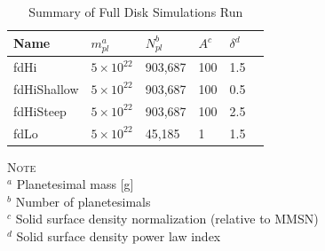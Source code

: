 \documentclass[twocolumn]{aastex63}
\begin{document}



\begin{table}
\caption{Summary of Full Disk Simulations Run}
\begin{tabular}{llllll} \hline \hline
Name    & $m_{pl}^{a}$ & $N_{pl}^{b}$ & $A^{c}$ & $\delta^{d}$ &  \\ \hline
fdHi                 & $5 \times 10^{22}$ & 903,687 & 100                                                         & 1.5                              &   \\
fdHiShallow    & $5 \times 10^{22}$ & 903,687 & 100                                                        & 0.5                              &   \\
fdHiSteep       & $5 \times 10^{22}$ & 903,687 & 100                                                         & 2.5                              &   \\
fdLo                & $5 \times 10^{22}$ & 45,185    & 1                                                             & 1.5                              &   \\ \hline
\end{tabular}
\begin{flushleft}
\textsc{Note} \\ {$^a$ Planetesimal mass [g] \\
		       $^b$ Number of planetesimals \\
		       $^c$ Solid surface density normalization (relative to MMSN) \\
		       $^d$ Solid surface density power law index } \\
\end{flushleft}
\label{tab:sims}
\end{table}
\end{document}
